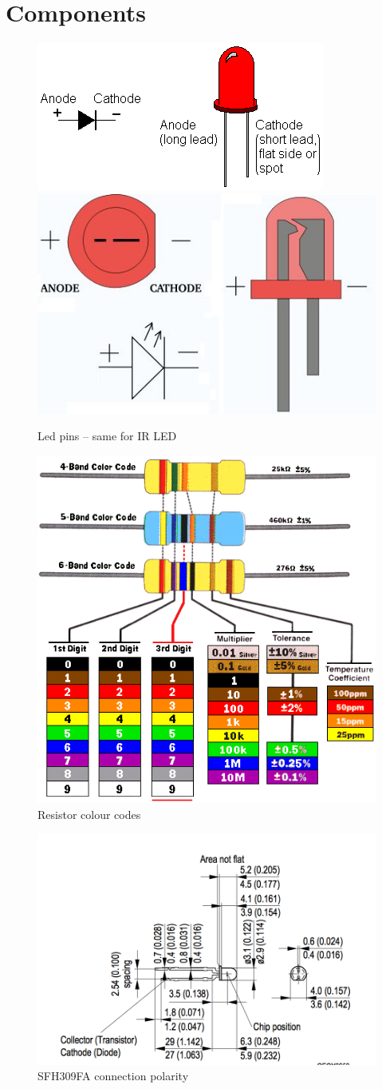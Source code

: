 \documentclass{instructions}
\begin{document}

\part{Components}

\begin{figure}[h!]
    \centering
    \includegraphics[width=0.4\linewidth]{encoder-008}\\
    \includegraphics[width=0.4\linewidth]{encoder-010}
    \caption{Led pins – same for IR LED }
    \label{}
\end{figure}


\begin{figure}[h!]
    \centering
    \includegraphics[width=0.6\linewidth]{encoder-012}
    \caption{Resistor colour codes}
    \label{}
\end{figure}
 

\begin{figure}[h!]
    \centering
    \includegraphics[width=0.9\linewidth]{encoder-013}
    \caption{SFH309FA connection polarity}
    \label{}
\end{figure}
 
\end{document}
